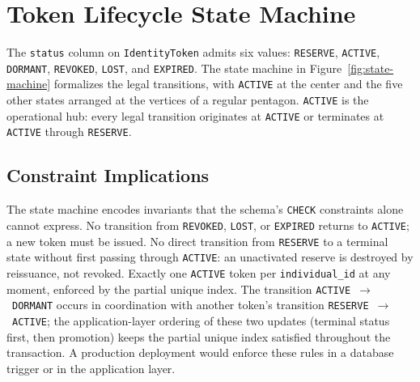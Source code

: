 \documentclass[11pt,letterpaper]{article}
\newcommand{\entity}[1]{\texttt{\color{navydark}#1}}
\begin{document}
\section{Token Lifecycle State Machine}
\label{app:state-machine}

The \texttt{status} column on \entity{IdentityToken} admits six values: \texttt{RESERVE}, \texttt{ACTIVE}, \texttt{DORMANT}, \texttt{REVOKED}, \texttt{LOST}, and \texttt{EXPIRED}. The state machine in Figure~\ref{fig:state-machine} formalizes the legal transitions, with \texttt{ACTIVE} at the center and the five other states arranged at the vertices of a regular pentagon. \texttt{ACTIVE} is the operational hub: every legal transition originates at \texttt{ACTIVE} or terminates at \texttt{ACTIVE} through \texttt{RESERVE}.

\subsection*{Constraint Implications}

The state machine encodes invariants that the schema's \texttt{CHECK} constraints alone cannot express. No transition from \texttt{REVOKED}, \texttt{LOST}, or \texttt{EXPIRED} returns to \texttt{ACTIVE}; a new token must be issued. No direct transition from \texttt{RESERVE} to a terminal state without first passing through \texttt{ACTIVE}: an unactivated reserve is destroyed by reissuance, not revoked. Exactly one \texttt{ACTIVE} token per \texttt{individual\_id} at any moment, enforced by the partial unique index. The transition \texttt{ACTIVE}~$\to$~\texttt{DORMANT} occurs in coordination with another token's transition \texttt{RESERVE}~$\to$~\texttt{ACTIVE}; the application-layer ordering of these two updates (terminal status first, then promotion) keeps the partial unique index satisfied throughout the transaction. A production deployment would enforce these rules in a database trigger or in the application layer.
\end{document}
